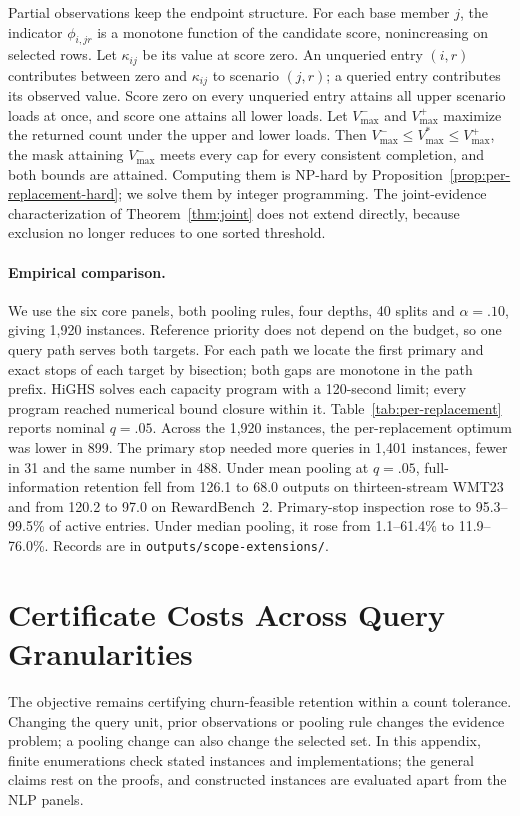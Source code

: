 Partial observations keep the endpoint structure. For each base member $j$, the indicator $\phi_{i,jr}$ is a monotone function of the candidate score, nonincreasing on selected rows. Let $\kappa_{ij}$ be its value at score zero. An unqueried entry $(i,r)$ contributes between zero and $\kappa_{ij}$ to scenario $(j,r)$; a queried entry contributes its observed value. Score zero on every unqueried entry attains all upper scenario loads at once, and score one attains all lower loads. Let $V^-_{\max}$ and $V^+_{\max}$ maximize the returned count under the upper and lower loads. Then $V^-_{\max}\le V^*_{\max}\le V^+_{\max}$, the mask attaining $V^-_{\max}$ meets every cap for every consistent completion, and both bounds are attained. Computing them is NP-hard by Proposition~\ref{prop:per-replacement-hard}; we solve them by integer programming. The joint-evidence characterization of Theorem~\ref{thm:joint} does not extend directly, because exclusion no longer reduces to one sorted threshold.

\paragraph{Empirical comparison.}
We use the six core panels, both pooling rules, four depths, 40 splits and $\alpha=.10$, giving 1,920 instances. Reference priority does not depend on the budget, so one query path serves both targets. For each path we locate the first primary and exact stops of each target by bisection; both gaps are monotone in the path prefix. HiGHS solves each capacity program with a 120-second limit; every program reached numerical bound closure within it. Table~\ref{tab:per-replacement} reports nominal $q=.05$. Across the 1,920 instances, the per-replacement optimum was lower in 899. The primary stop needed more queries in 1,401 instances, fewer in 31 and the same number in 488. Under mean pooling at $q=.05$, full-information retention fell from 126.1 to 68.0 outputs on thirteen-stream WMT23 and from 120.2 to 97.0 on RewardBench~2. Primary-stop inspection rose to 95.3--99.5\% of active entries. Under median pooling, it rose from 1.1--61.4\% to 11.9--76.0\%. Records are in \nolinkurl{outputs/scope-extensions/}.

\section{Certificate Costs Across Query Granularities}
\label{app:granularity}
The objective remains certifying churn-feasible retention within a count tolerance. Changing the query unit, prior observations or pooling rule changes the evidence problem; a pooling change can also change the selected set. In this appendix, finite enumerations check stated instances and implementations; the general claims rest on the proofs, and constructed instances are evaluated apart from the NLP panels.

